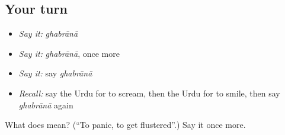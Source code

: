 \subsection*{Your turn}
\begin{itemize}
\raggedright
  \item \emph{Say it:} \emph{ghabrānā}
  \item \emph{Say it:} \emph{ghabrānā}, once more
  \item \emph{Say it:} say \emph{ghabrānā}
  \item \emph{Recall:} say the Urdu for to scream, then the Urdu for to smile, then say \emph{ghabrānā} again
\end{itemize}

\begin{tcolorbox}[breakable,colback=teal!4,colframe=teal!35!black,title={Before you move on}]
What does  mean? (\textquotedblleft{}To panic, to get flustered\textquotedblright{}.) Say it once more.
\end{tcolorbox}
